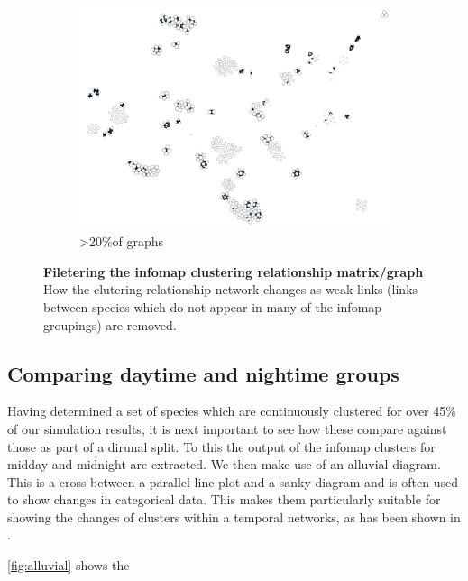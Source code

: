 \begin{figure}[H]
\begin{subfigure}[t]{.5\textwidth}
  \centering
  \includegraphics[width=\textwidth]{fig/c3.png}
  \caption{>20\%of graphs}
\end{subfigure}%
\caption{\textbf{Filetering the infomap clustering relationship matrix/graph} How the clutering relationship network changes as weak links (links between species which do not appear in many of the infomap groupings) are removed. }
\label{fig:infomapprune}
\end{figure}

\subsection{Comparing daytime and nightime groups}
Having determined a set of species which are continuously clustered for over 45\% of our simulation results, it is next important to see how these compare against those as part of a dirunal split. To this the output of the infomap clusters for midday and midnight are extracted. We then make use of an alluvial diagram. This is a cross between a parallel line plot and a sanky diagram and is often used to show changes in categorical data. This makes them particularly suitable for showing the changes of clusters within a temporal networks, as has been shown in \citep{alluvial}.

\autoref{fig:alluvial} shows the




